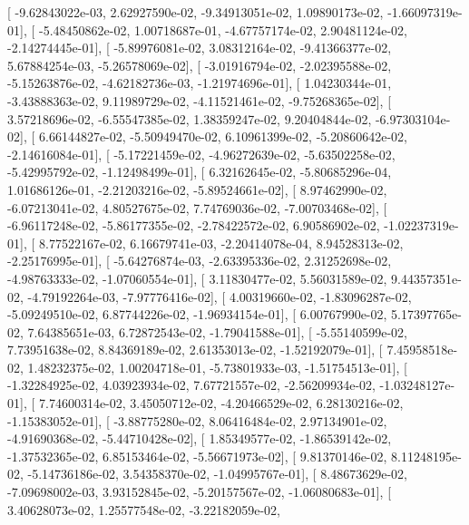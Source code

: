 \documentclass{article}
\begin{document}
       [ -9.62843022e-03,   2.62927590e-02,  -9.34913051e-02,
          1.09890173e-02,  -1.66097319e-01],
       [ -5.48450862e-02,   1.00718687e-01,  -4.67757174e-02,
          2.90481124e-02,  -2.14274445e-01],
       [ -5.89976081e-02,   3.08312164e-02,  -9.41366377e-02,
          5.67884254e-03,  -5.26578069e-02],
       [ -3.01916794e-02,  -2.02395588e-02,  -5.15263876e-02,
         -4.62182736e-03,  -1.21974696e-01],
       [  1.04230344e-01,  -3.43888363e-02,   9.11989729e-02,
         -4.11521461e-02,  -9.75268365e-02],
       [  3.57218696e-02,  -6.55547385e-02,   1.38359247e-02,
          9.20404844e-02,  -6.97303104e-02],
       [  6.66144827e-02,  -5.50949470e-02,   6.10961399e-02,
         -5.20860642e-02,  -2.14616084e-01],
       [ -5.17221459e-02,  -4.96272639e-02,  -5.63502258e-02,
         -5.42995792e-02,  -1.12498499e-01],
       [  6.32162645e-02,  -5.80685296e-04,   1.01686126e-01,
         -2.21203216e-02,  -5.89524661e-02],
       [  8.97462990e-02,  -6.07213041e-02,   4.80527675e-02,
          7.74769036e-02,  -7.00703468e-02],
       [ -6.96117248e-02,  -5.86177355e-02,  -2.78422572e-02,
          6.90586902e-02,  -1.02237319e-01],
       [  8.77522167e-02,   6.16679741e-03,  -2.20414078e-04,
          8.94528313e-02,  -2.25176995e-01],
       [ -5.64276874e-03,  -2.63395336e-02,   2.31252698e-02,
         -4.98763333e-02,  -1.07060554e-01],
       [  3.11830477e-02,   5.56031589e-02,   9.44357351e-02,
         -4.79192264e-03,  -7.97776416e-02],
       [  4.00319660e-02,  -1.83096287e-02,  -5.09249510e-02,
          6.87744226e-02,  -1.96934154e-01],
       [  6.00767990e-02,   5.17397765e-02,   7.64385651e-03,
          6.72872543e-02,  -1.79041588e-01],
       [ -5.55140599e-02,   7.73951638e-02,   8.84369189e-02,
          2.61353013e-02,  -1.52192079e-01],
       [  7.45958518e-02,   1.48232375e-02,   1.00204718e-01,
         -5.73801933e-03,  -1.51754513e-01],
       [ -1.32284925e-02,   4.03923934e-02,   7.67721557e-02,
         -2.56209934e-02,  -1.03248127e-01],
       [  7.74600314e-02,   3.45050712e-02,  -4.20466529e-02,
          6.28130216e-02,  -1.15383052e-01],
       [ -3.88775280e-02,   8.06416484e-02,   2.97134901e-02,
         -4.91690368e-02,  -5.44710428e-02],
       [  1.85349577e-02,  -1.86539142e-02,  -1.37532365e-02,
          6.85153464e-02,  -5.56671973e-02],
       [  9.81370146e-02,   8.11248195e-02,  -5.14736186e-02,
          3.54358370e-02,  -1.04995767e-01],
       [  8.48673629e-02,  -7.09698002e-03,   3.93152845e-02,
         -5.20157567e-02,  -1.06080683e-01],
       [  3.40628073e-02,   1.25577548e-02,  -3.22182059e-02,
\end{document}
